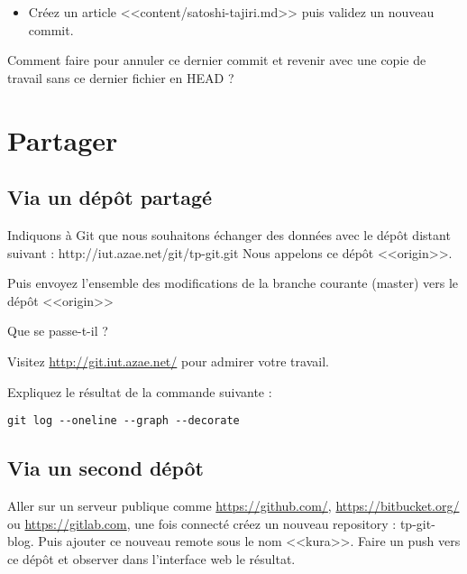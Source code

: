 \documentclass[a4paper]{article}
\begin{document}
\begin{itemize}
  \item Créez un article <<content/satoshi-tajiri.md>> puis validez un nouveau commit.
\end{itemize}

Comment faire pour annuler ce dernier commit et revenir avec une copie de travail sans ce dernier fichier en HEAD ?

\section{Partager}

\subsection{Via un dépôt partagé}

Indiquons à Git que nous souhaitons échanger des données avec le dépôt distant suivant : http://iut.azae.net/git/tp-git.git
Nous appelons ce dépôt <<origin>>.

Puis envoyez l'ensemble des modifications de la branche courante (master) vers le dépôt <<origin>>

Que se passe-t-il ?

Visitez \url{http://git.iut.azae.net/} pour admirer votre travail.

Expliquez le résultat de la commande suivante : 
\begin{verbatim}
git log --oneline --graph --decorate
\end{verbatim}

\subsection{Via un second dépôt}

Aller sur un serveur publique comme \url{https://github.com/}, \url{https://bitbucket.org/} ou \url{https://gitlab.com}, une fois connecté créez un nouveau repository : tp-git-blog. Puis ajouter ce nouveau remote sous le nom <<kura>>. Faire un push vers ce dépôt et observer dans l'interface web le résultat.
\end{document}
